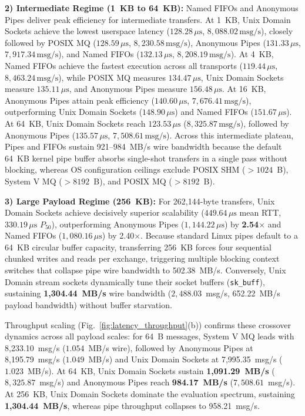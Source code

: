 \textbf{2) Intermediate Regime (1~KB to 64~KB):} Named FIFOs and Anonymous Pipes deliver peak efficiency for intermediate transfers. At 1~KB, Unix Domain Sockets achieve the lowest userspace latency ($128.28\,\mu\text{s}$, $8,088.02\,\text{msg/s}$), closely followed by POSIX MQ ($128.59\,\mu\text{s}$, $8,230.58\,\text{msg/s}$), Anonymous Pipes ($131.33\,\mu\text{s}$, $7,917.34\,\text{msg/s}$), and Named FIFOs ($132.13\,\mu\text{s}$, $8,208.19\,\text{msg/s}$). At 4~KB, Named FIFOs achieve the fastest execution across all transports ($119.44\,\mu\text{s}$, $8,463.24\,\text{msg/s}$), while POSIX MQ measures $134.47\,\mu\text{s}$, Unix Domain Sockets measure $135.11\,\mu\text{s}$, and Anonymous Pipes measure $156.48\,\mu\text{s}$. At 16~KB, Anonymous Pipes attain peak efficiency ($140.60\,\mu\text{s}$, $7,676.41\,\text{msg/s}$), outperforming Unix Domain Sockets ($148.90\,\mu\text{s}$) and Named FIFOs ($151.67\,\mu\text{s}$). At 64~KB, Unix Domain Sockets reach $123.53\,\mu\text{s}$ ($8,325.87\,\text{msg/s}$), followed by Anonymous Pipes ($135.57\,\mu\text{s}$, $7,508.61\,\text{msg/s}$). Across this intermediate plateau, Pipes and FIFOs sustain 921--984~MB/s wire bandwidth because the default 64~KB kernel pipe buffer absorbs single-shot transfers in a single pass without blocking, whereas OS configuration ceilings exclude POSIX SHM ($>1024$~B), System V MQ ($>8192$~B), and POSIX MQ ($>8192$~B).

\textbf{3) Large Payload Regime (256~KB):} For 262,144-byte transfers, Unix Domain Sockets achieve decisively superior scalability ($449.64\,\mu\text{s}$ mean RTT, $330.19\,\mu\text{s}$ $P_{50}$), outperforming Anonymous Pipes ($1,144.22\,\mu\text{s}$) by \textbf{2.54$\times$} and Named FIFOs ($1,080.16\,\mu\text{s}$) by 2.40$\times$. Because standard Linux pipes default to a 64~KB circular buffer capacity, transferring 256~KB forces four sequential chunked writes and reads per exchange, triggering multiple blocking context switches that collapse pipe wire bandwidth to 502.38~MB/s. Conversely, Unix Domain stream sockets dynamically tune their socket buffers (\texttt{sk\_buff}), sustaining \textbf{1,304.44~MB/s} wire bandwidth ($2,488.03$~msg/s, 652.22~MB/s payload bandwidth) without buffer starvation.

Throughput scaling (Fig.~\ref{fig:latency_throughput}(b)) confirms these crossover dynamics across all payload scales: for 64~B messages, System V MQ leads with 8,233.10~msg/s ($1.054$~MB/s wire), followed by Anonymous Pipes at 8,195.79~msg/s ($1.049$~MB/s) and Unix Domain Sockets at 7,995.35~msg/s ($1.023$~MB/s). At 64~KB, Unix Domain Sockets sustain \textbf{1,091.29~MB/s} ($8,325.87$~msg/s) and Anonymous Pipes reach \textbf{984.17~MB/s} ($7,508.61$~msg/s). At 256~KB, Unix Domain Sockets dominate the evaluation spectrum, sustaining \textbf{1,304.44~MB/s}, whereas pipe throughput collapses to 958.21~msg/s.

